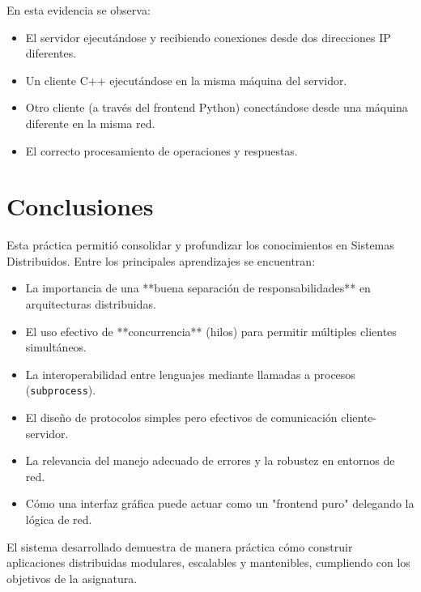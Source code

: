 \documentclass[12pt,a4paper]{article}
\begin{document}
En esta evidencia se observa:
\begin{itemize}
    \item El servidor ejecutándose y recibiendo conexiones desde dos direcciones IP diferentes.
    \item Un cliente C++ ejecutándose en la misma máquina del servidor.
    \item Otro cliente (a través del frontend Python) conectándose desde una máquina diferente en la misma red.
    \item El correcto procesamiento de operaciones y respuestas.
\end{itemize}

\section{Conclusiones}

Esta práctica permitió consolidar y profundizar los conocimientos en Sistemas Distribuidos. Entre los principales aprendizajes se encuentran:

\begin{itemize}
    \item La importancia de una **buena separación de responsabilidades** en arquitecturas distribuidas.
    \item El uso efectivo de **concurrencia** (hilos) para permitir múltiples clientes simultáneos.
    \item La interoperabilidad entre lenguajes mediante llamadas a procesos (\texttt{subprocess}).
    \item El diseño de protocolos simples pero efectivos de comunicación cliente-servidor.
    \item La relevancia del manejo adecuado de errores y la robustez en entornos de red.
    \item Cómo una interfaz gráfica puede actuar como un "frontend puro" delegando la lógica de red.
\end{itemize}

El sistema desarrollado demuestra de manera práctica cómo construir aplicaciones distribuidas modulares, escalables y mantenibles, cumpliendo con los objetivos de la asignatura.
\end{document}
